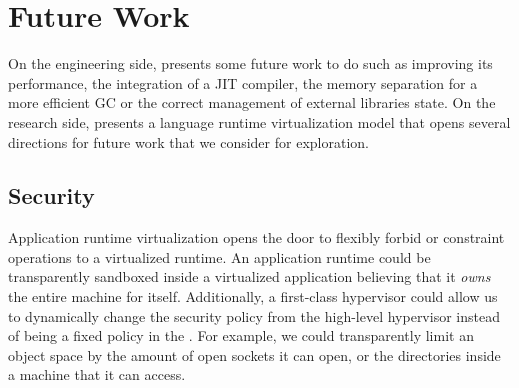 %
%
%
%
%
%
%
%
%

\section{Future Work}

On the engineering side, \Vtt presents some future work to do such as improving its performance, the integration of a JIT compiler, the memory separation for a more efficient GC or the correct management of external libraries state. On the research side, \Vtt presents a language runtime virtualization model that opens several directions for future work that we consider for exploration.

\subsection{Security} Application runtime virtualization opens the door to flexibly forbid or constraint operations to a virtualized runtime. An application runtime could be transparently sandboxed inside a virtualized application believing that it \emph{owns} the entire machine for itself. Additionally, a first-class hypervisor could allow us to dynamically change the security policy from the high-level hypervisor instead of being a fixed policy in the \VM. For example, we could transparently limit an object space by the amount of open sockets it can open, or the directories inside a machine that it can access.

